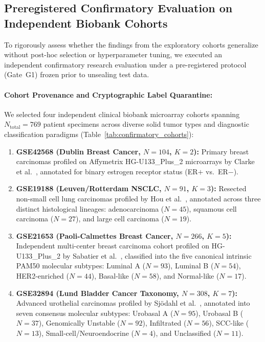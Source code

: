 \documentclass[pdflatex,sn-mathphys-num]{sn-jnl}
\theoremstyle{thmstyleone}
\theoremstyle{thmstyletwo}
\theoremstyle{thmstylethree}
\begin{document}
\subsection{Preregistered Confirmatory Evaluation on Independent Biobank Cohorts}\label{sec:confirmatory_eval}

To rigorously assess whether the findings from the exploratory cohorts generalize without post-hoc selection or hyperparameter tuning, we executed an independent confirmatory research evaluation under a pre-registered protocol (Gate~G1) frozen prior to unsealing test data. 

\paragraph{Cohort Provenance and Cryptographic Label Quarantine:}
We selected four independent clinical biobank microarray cohorts spanning $N_{\text{total}} = 769$ patient specimens across diverse solid tumor types and diagnostic classification paradigms (Table~\ref{tab:confirmatory_cohorts}):
\begin{enumerate}
    \item \textbf{GSE42568 (Dublin Breast Cancer, $N=104$, $K=2$):} Primary breast carcinomas profiled on Affymetrix HG-U133_Plus_2 microarrays by Clarke et al.~\cite{clarke2013gse42568}, annotated for binary estrogen receptor status (ER$+$ vs.\ ER$-$).
    \item \textbf{GSE19188 (Leuven/Rotterdam NSCLC, $N=91$, $K=3$):} Resected non-small cell lung carcinomas profiled by Hou et al.~\cite{hou2010gse19188}, annotated across three distinct histological lineages: adenocarcinoma ($N=45$), squamous cell carcinoma ($N=27$), and large cell carcinoma ($N=19$).
    \item \textbf{GSE21653 (Paoli-Calmettes Breast Cancer, $N=266$, $K=5$):} Independent multi-center breast carcinoma cohort profiled on HG-U133_Plus_2 by Sabatier et al.~\cite{sabatier2011gse21653}, classified into the five canonical intrinsic PAM50 molecular subtypes: Luminal A ($N=93$), Luminal B ($N=54$), HER2-enriched ($N=44$), Basal-like ($N=58$), and Normal-like ($N=17$).
    \item \textbf{GSE32894 (Lund Bladder Cancer Taxonomy, $N=308$, $K=7$):} Advanced urothelial carcinomas profiled by Sj{\"o}dahl et al.~\cite{sjodahl2012gse32894}, annotated into seven consensus molecular subtypes: Urobasal A ($N=95$), Urobasal B ($N=37$), Genomically Unstable ($N=92$), Infiltrated ($N=56$), SCC-like ($N=13$), Small-cell/Neuroendocrine ($N=4$), and Unclassified ($N=11$).
\end{enumerate}
\end{document}
